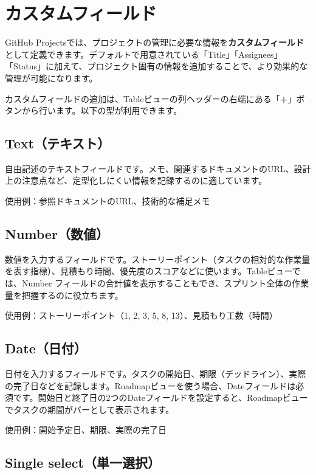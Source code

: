 \section{カスタムフィールド}

GitHub Projectsでは、プロジェクトの管理に必要な情報を\textbf{カスタムフィールド}として定義できます。デフォルトで用意されている「Title」「Assignees」「Status」に加えて、プロジェクト固有の情報を追加することで、より効果的な管理が可能になります。

カスタムフィールドの追加は、Tableビューの列ヘッダーの右端にある「\textbf{+}」ボタンから行います。以下の型が利用できます。

\subsection{Text（テキスト）}

自由記述のテキストフィールドです。メモ、関連するドキュメントのURL、設計上の注意点など、定型化しにくい情報を記録するのに適しています。

使用例：参照ドキュメントのURL、技術的な補足メモ

\subsection{Number（数値）}

数値を入力するフィールドです。ストーリーポイント（タスクの相対的な作業量を表す指標）、見積もり時間、優先度のスコアなどに使います。Tableビューでは、Number フィールドの合計値を表示することもでき、スプリント全体の作業量を把握するのに役立ちます。

使用例：ストーリーポイント（1, 2, 3, 5, 8, 13）、見積もり工数（時間）

\subsection{Date（日付）}

日付を入力するフィールドです。タスクの開始日、期限（デッドライン）、実際の完了日などを記録します。Roadmapビューを使う場合、Dateフィールドは必須です。開始日と終了日の2つのDateフィールドを設定すると、Roadmapビューでタスクの期間がバーとして表示されます。

使用例：開始予定日、期限、実際の完了日

\subsection{Single select（単一選択）}

